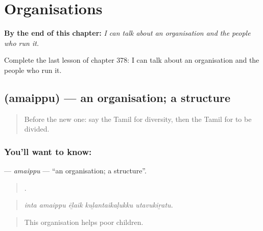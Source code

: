 
\chapter{Organisations}
\label{ch:ta-organisations}

\begin{chapteropening}
\textbf{By the end of this chapter:} \emph{I can talk about an organisation and the people who run it.}

Complete the last lesson of chapter 378: I can talk about an organisation and the people who run it.
\end{chapteropening}

\section[\texorpdfstring{\ta{அமைப்பு} (amaippu)}{அமைப்பு (amaippu)}]{ (amaippu) — an organisation; a structure}

\label{lesson:TA-C378-amaippu}



\begin{quote}
Before the new one: say the Tamil for diversity, then the Tamil for to be divided.
\end{quote}

\subsection*{You'll want to know: }
\textbf{} — \emph{amaippu} — \textquotedblleft{}an organisation; a structure\textquotedblright{}.

\begin{quote}
    .
\end{quote}

\begin{quote}
\emph{inta amaippu ēḻaik kuḻantaikaḷukku utavukiṟatu.}
\end{quote}

\begin{quote}
This organisation helps poor children.
\end{quote}

